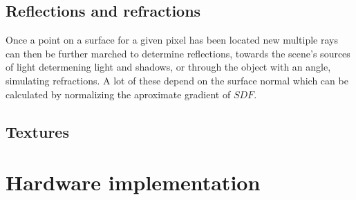 	\subsection{Reflections and refractions}
		Once a point on a surface for a given pixel has been located new
		multiple rays can then be further marched to determine reflections,
		towards the scene's sources of light determening light and shadows, or
		through the object with an angle, simulating refractions. A lot of
		these depend on the surface normal which can be calculated by
		normalizing the aproximate gradient of $SDF$. 
	
	\subsection{Textures}
	
	\section{Hardware implementation}
